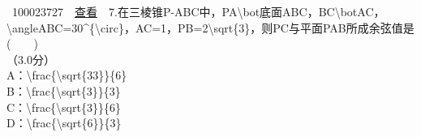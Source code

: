 ~{{100023727}~~\href{../question/viewQuestionDetail.jsp?questionID=100023727\&testPaperId=100229072}{查看}~~7.在三棱锥P-ABC中，PA{\textbackslash{}bot}底面ABC，BC{\textbackslash{}bot}AC，{\textbackslash{}angle}ABC=30{\^{}\{\textbackslash{}circ\}}，AC=1，PB=2{\textbackslash{}sqrt\{3\}}，则PC与平面PAB所成余弦值是(　　)\\
\hspace*{0.333em}\hspace*{0.333em}（3.0分）\\
\hspace*{0.333em}\hspace*{0.333em}\hspace*{0.333em}\hspace*{0.333em}\hspace*{0.333em}\hspace*{0.333em}\hspace*{0.333em}\hspace*{0.333em}A：{\textbackslash{}frac\{\textbackslash{}sqrt\{33\}\}\{6\}}\\
\hspace*{0.333em}\hspace*{0.333em}\hspace*{0.333em}\hspace*{0.333em}\hspace*{0.333em}\hspace*{0.333em}\hspace*{0.333em}\hspace*{0.333em}B：{\textbackslash{}frac\{\textbackslash{}sqrt\{3\}\}\{3\}}\\
\hspace*{0.333em}\hspace*{0.333em}\hspace*{0.333em}\hspace*{0.333em}\hspace*{0.333em}\hspace*{0.333em}\hspace*{0.333em}\hspace*{0.333em}C：{\textbackslash{}frac\{\textbackslash{}sqrt\{3\}\}\{6\}}\\
\hspace*{0.333em}\hspace*{0.333em}\hspace*{0.333em}\hspace*{0.333em}\hspace*{0.333em}\hspace*{0.333em}\hspace*{0.333em}\hspace*{0.333em}D：{\textbackslash{}frac\{\textbackslash{}sqrt\{6\}\}\{3\}}\\
}

